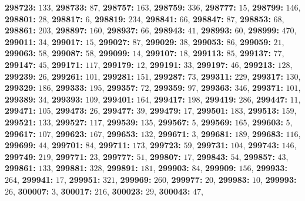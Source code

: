 \textsf{\bfseries 298723:} $133$, \textsf{\bfseries 298733:} $87$, \textsf{\bfseries 298757:} $163$, \textsf{\bfseries 298759:} $336$, \textsf{\bfseries 298777:} $15$, \textsf{\bfseries 298799:} $146$, \textsf{\bfseries 298801:} $28$, \textsf{\bfseries 298817:} $6$, \textsf{\bfseries 298819:} $234$, \textsf{\bfseries 298841:} $66$, \textsf{\bfseries 298847:} $87$, \textsf{\bfseries 298853:} $68$, \textsf{\bfseries 298861:} $203$, \textsf{\bfseries 298897:} $160$, \textsf{\bfseries 298937:} $66$, \textsf{\bfseries 298943:} $41$, \textsf{\bfseries 298993:} $60$, \textsf{\bfseries 298999:} $470$, \textsf{\bfseries 299011:} $34$, \textsf{\bfseries 299017:} $15$, \textsf{\bfseries 299027:} $87$, \textsf{\bfseries 299029:} $38$, \textsf{\bfseries 299053:} $86$, \textsf{\bfseries 299059:} $21$, \textsf{\bfseries 299063:} $58$, \textsf{\bfseries 299087:} $58$, \textsf{\bfseries 299099:} $14$, \textsf{\bfseries 299107:} $18$, \textsf{\bfseries 299113:} $85$, \textsf{\bfseries 299137:} $77$, \textsf{\bfseries 299147:} $45$, \textsf{\bfseries 299171:} $117$, \textsf{\bfseries 299179:} $12$, \textsf{\bfseries 299191:} $33$, \textsf{\bfseries 299197:} $46$, \textsf{\bfseries 299213:} $128$, \textsf{\bfseries 299239:} $26$, \textsf{\bfseries 299261:} $101$, \textsf{\bfseries 299281:} $151$, \textsf{\bfseries 299287:} $73$, \textsf{\bfseries 299311:} $229$, \textsf{\bfseries 299317:} $130$, \textsf{\bfseries 299329:} $186$, \textsf{\bfseries 299333:} $195$, \textsf{\bfseries 299357:} $72$, \textsf{\bfseries 299359:} $97$, \textsf{\bfseries 299363:} $346$, \textsf{\bfseries 299371:} $101$, \textsf{\bfseries 299389:} $34$, \textsf{\bfseries 299393:} $109$, \textsf{\bfseries 299401:} $164$, \textsf{\bfseries 299417:} $198$, \textsf{\bfseries 299419:} $286$, \textsf{\bfseries 299447:} $11$, \textsf{\bfseries 299471:} $105$, \textsf{\bfseries 299473:} $26$, \textsf{\bfseries 299477:} $39$, \textsf{\bfseries 299479:} $17$, \textsf{\bfseries 299501:} $183$, \textsf{\bfseries 299513:} $159$, \textsf{\bfseries 299521:} $133$, \textsf{\bfseries 299527:} $117$, \textsf{\bfseries 299539:} $135$, \textsf{\bfseries 299567:} $5$, \textsf{\bfseries 299569:} $165$, \textsf{\bfseries 299603:} $5$, \textsf{\bfseries 299617:} $107$, \textsf{\bfseries 299623:} $167$, \textsf{\bfseries 299653:} $132$, \textsf{\bfseries 299671:} $3$, \textsf{\bfseries 299681:} $189$, \textsf{\bfseries 299683:} $116$, \textsf{\bfseries 299699:} $44$, \textsf{\bfseries 299701:} $84$, \textsf{\bfseries 299711:} $173$, \textsf{\bfseries 299723:} $59$, \textsf{\bfseries 299731:} $104$, \textsf{\bfseries 299743:} $146$, \textsf{\bfseries 299749:} $219$, \textsf{\bfseries 299771:} $23$, \textsf{\bfseries 299777:} $51$, \textsf{\bfseries 299807:} $17$, \textsf{\bfseries 299843:} $54$, \textsf{\bfseries 299857:} $43$, \textsf{\bfseries 299861:} $133$, \textsf{\bfseries 299881:} $328$, \textsf{\bfseries 299891:} $181$, \textsf{\bfseries 299903:} $84$, \textsf{\bfseries 299909:} $156$, \textsf{\bfseries 299933:} $264$, \textsf{\bfseries 299941:} $17$, \textsf{\bfseries 299951:} $321$, \textsf{\bfseries 299969:} $260$, \textsf{\bfseries 299977:} $20$, \textsf{\bfseries 299983:} $10$, \textsf{\bfseries 299993:} $26$, \textsf{\bfseries 300007:} $3$, \textsf{\bfseries 300017:} $216$, \textsf{\bfseries 300023:} $29$, \textsf{\bfseries 300043:} $47$, 

